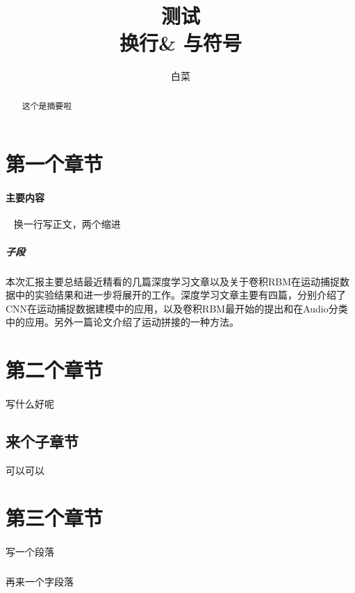 \documentclass{article}
\title{测试\\换行\& 与符号}%
\author{白菜}%
\begin{document}
\maketitle%
\tableofcontents %
\vspace{8pt} %
\renewcommand{\abstractname}{\huge 摘\quad 要}
\begin{abstract} %
\normalsize
\noindent 这个是摘要啦
\end{abstract}
\section{第一个章节}
\paragraph{主要内容}~{} \newline \indent 换一行写正文，两个缩进
\subparagraph{子段}本次汇报主要总结最近精看的几篇深度学习文章以及关于卷积RBM在运动捕捉数据中的实验结果和进一步将展开的工作。深度学习文章主要有四篇，分别介绍了CNN在运动捕捉数据建模中的应用，以及卷积RBM最开始的提出和在Audio分类中的应用。另外一篇论文介绍了运动拼接的一种方法。
 
\section{第二个章节}
\paragraph{} 写什么好呢
\subsection{来个子章节}可以可以
 
\section{第三个章节}
\paragraph{}写一个段落
\subparagraph{}再来一个字段落
\end{document}
